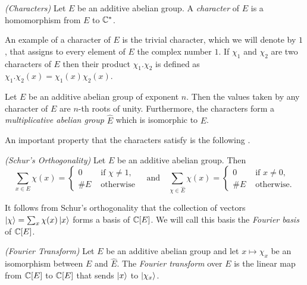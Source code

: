 \documentclass[11pt]{article}
\begin{document}
\begin{definition}
\emph{\textsf{(Characters)}} Let $E$ be an additive abelian group. A
\emph{character} of $E$ is a homomorphism from $E$ to $\mathbb{C}^*$.
\end{definition}

An example of a character of $E$ is the trivial character, which we
will denote by $1$, that assigns to every element of $E$ the complex
number $1$. If $\chi_1$ and $\chi_2$ are two characters of $E$ then
their product $\chi_1 . \chi_2$ is defined as $\chi_1 . \chi_2(x) =
\chi_1(x) \chi_2(x)$.

\begin{proposition}\cite[Chapter 17, Theorem 1]{Igor}\label{prop:dual-isomorphism}
  Let $E$ be an additive abelian group of exponent $n$. Then the
  values taken by any character of $E$ are $n$-th roots of
  unity. Furthermore, the characters form a \emph{multiplicative
    abelian group} $\hat{E}$ which is isomorphic to $E$.
\end{proposition}

An important property that the characters satisfy is the following
\cite[Corollary 2.14]{Isaacs}.

\begin{proposition}\label{prop:schur-orthogonality}
\emph{\textsf{(Schur's Orthogonality)}}
  Let $E$ be an additive abelian group. Then
  \[ \sum_{x \in E} \chi(x) =%
  \begin{cases}
    0 & \textrm{ if $\chi \neq 1$,}\\
    \# E &\textrm{ otherwise}
  \end{cases} \quad \text{and}\quad
  \sum_{\chi \in \hat{E}} \chi(x) =%
  \begin{cases}
    0 & \textrm{ if $x \neq 0$,}\\
    \# E &\textrm{ otherwise.}
  \end{cases}
  \]
\end{proposition}

It follows from Schur's orthogonality that the collection of vectors
$\left| \chi \right\rangle = \sum_x \chi(x) \left| x \right\rangle$ forms a basis of $\mathbb{C}[E]$. We
will call this basis the \emph{Fourier basis} of $\mathbb{C}[E]$.

\begin{definition}
\emph{\textsf{(Fourier Transform)}}
Let $E$ be an additive abelian group and let $x \mapsto \chi_x$ be an
isomorphism between $E$ and $\hat{E}$. The \emph{Fourier transform}
over $E$ is the linear map from $\mathbb{C}[E]$ to $\mathbb{C}[E]$ that sends
$\left| x \right\rangle$ to $\left| \chi_x \right\rangle$.
\end{definition}
\end{document}

